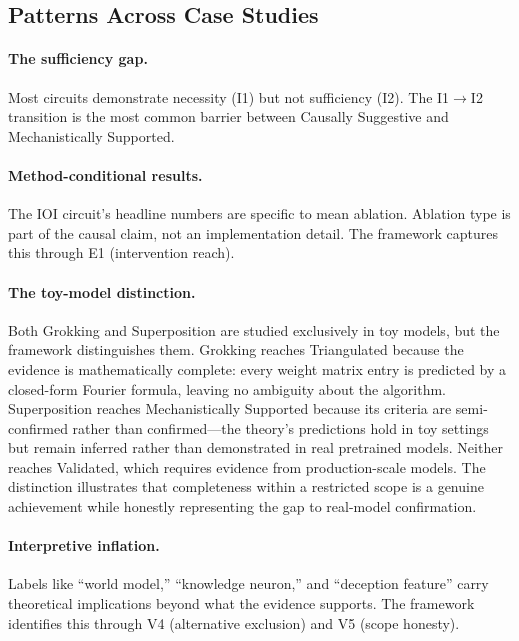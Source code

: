 \documentclass[10pt]{article}
\begin{document}
\subsection{Patterns Across Case Studies}

\paragraph{The sufficiency gap.} Most circuits demonstrate necessity (I1) but not sufficiency (I2). The I1$\rightarrow$I2 transition is the most common barrier between Causally Suggestive and Mechanistically Supported.

\paragraph{Method-conditional results.} The IOI circuit's headline numbers are specific to mean ablation. Ablation type is part of the causal claim, not an implementation detail. The framework captures this through E1 (intervention reach).

\paragraph{The toy-model distinction.} Both Grokking and Superposition are studied exclusively in toy models, but the framework distinguishes them. Grokking reaches Triangulated because the evidence is mathematically complete: every weight matrix entry is predicted by a closed-form Fourier formula, leaving no ambiguity about the algorithm. Superposition reaches Mechanistically Supported because its criteria are semi-confirmed rather than confirmed---the theory's predictions hold in toy settings but remain inferred rather than demonstrated in real pretrained models. Neither reaches Validated, which requires evidence from production-scale models. The distinction illustrates that completeness within a restricted scope is a genuine achievement while honestly representing the gap to real-model confirmation.

\paragraph{Interpretive inflation.} Labels like ``world model,'' ``knowledge neuron,'' and ``deception feature'' carry theoretical implications beyond what the evidence supports. The framework identifies this through V4 (alternative exclusion) and V5 (scope honesty).

\end{document}
